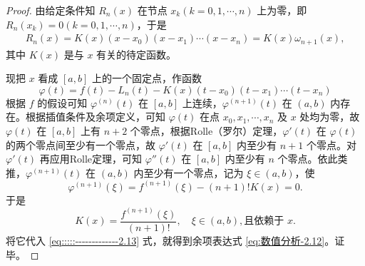 \documentclass[../../main.tex]{subfiles}
\begin{document}
\begin{proof}
由给定条件知 $R_n(x)$ 在节点 $x_k (k = 0, 1, \cdots, n)$ 上为零，即 $R_n(x_k) = 0 (k = 0, 1, \cdots, n)$，于是 
\begin{align}
R_n(x) = K(x)(x - x_0)(x - x_1) \cdots (x - x_n) = K(x) \omega_{n + 1}(x),\label{eq:::::-------------2.13}
\end{align}
其中 $K(x)$ 是与 $x$ 有关的待定函数。

现把 $x$ 看成 $[a, b]$ 上的一个固定点，作函数 
\[
\varphi(t) = f(t) - L_n(t) - K(x)(t - x_0)(t - x_1) \cdots (t - x_n)
\]
根据 $f$ 的假设可知 $\varphi^{(n)}(t)$ 在 $[a, b]$ 上连续，$\varphi^{(n + 1)}(t)$ 在 $(a, b)$ 内存在。根据插值条件及余项定义，可知 $\varphi(t)$ 在点 $x_0, x_1, \cdots, x_n$ 及 $x$ 处均为零，故 $\varphi(t)$ 在 $[a, b]$ 上有 $n + 2$ 个零点，根据Rolle（罗尔）定理，$\varphi'(t)$ 在 $\varphi(t)$ 的两个零点间至少有一个零点，故 $\varphi'(t)$ 在 $[a, b]$ 内至少有 $n + 1$ 个零点。对 $\varphi'(t)$ 再应用Rolle定理，可知 $\varphi''(t)$ 在 $[a, b]$ 内至少有 $n$ 个零点。依此类推，$\varphi^{(n + 1)}(t)$ 在 $(a, b)$ 内至少有一个零点，记为 $\xi \in (a, b)$，使 
\[
\varphi^{(n + 1)}(\xi) = f^{(n + 1)}(\xi) - (n + 1)! K(x) = 0.
\]
于是 
\[
K(x) = \frac{f^{(n + 1)}(\xi)}{(n + 1)!}, \quad \xi \in (a, b), \text{且依赖于 } x.
\]
将它代入 \eqref{eq:::::-------------2.13} 式，就得到余项表达式 \eqref{eq:数值分析-2.12}。证毕。

\end{proof}
\end{document}
